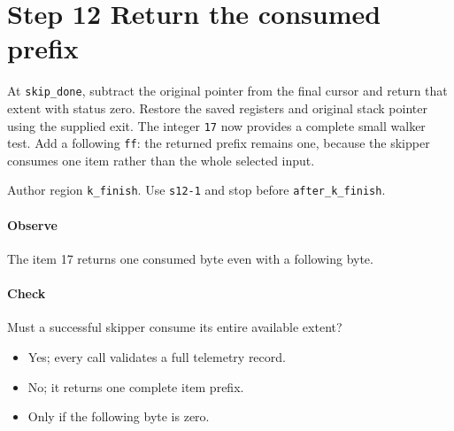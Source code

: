 \section{Step 12 Return the consumed prefix}\label{cbor-s12}
At \texttt{skip\_done}, subtract the original pointer from the final cursor and return that extent with status zero. Restore the saved registers and original stack pointer using the supplied exit. The integer \texttt{17} now provides a complete small walker test. Add a following \texttt{ff}: the returned prefix remains one, because the skipper consumes one item rather than the whole selected input.

Author region \texttt{k\_finish}. Use \texttt{s12-1} and stop before \texttt{after\_k\_finish}.

\paragraph{Observe} The item 17 returns one consumed byte even with a following byte.

\paragraph{Check} Must a successful skipper consume its entire available extent?
\begin{itemize}
\item[A.] Yes; every call validates a full telemetry record.
\item[B.] No; it returns one complete item prefix.
\item[C.] Only if the following byte is zero.
\end{itemize}
